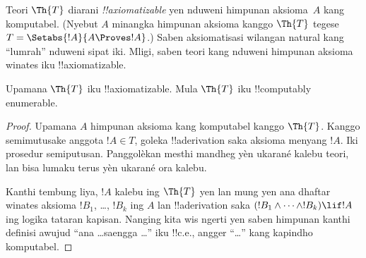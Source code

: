 \documentclass[../../../include/open-logic-section]{subfiles}
\begin{document}


Teori $\Th{T}$ diarani \emph{!!{axiomatizable}} yen nduweni
himpunan aksioma~$A$ kang komputabel. (Nyebut $A$ minangka himpunan
aksioma kanggo $\Th{T}$ tegese $T = \Setabs{!A}{A \Proves !A}$.)
Saben aksiomatisasi wilangan natural kang ``lumrah'' nduweni sipat iki.
Mligi, saben teori kang nduweni himpunan aksioma winates iku
!!{axiomatizable}.

\begin{lem}
Upamana $\Th{T}$ iku !!{axiomatizable}. Mula $\Th{T}$ iku !!{computably
enumerable}.
\end{lem}

\begin{proof}
Upamana $A$ himpunan aksioma kang komputabel kanggo $\Th{T}$. Kanggo
semimutusake anggota $!A \in T$, goleka !!a{derivation} saka aksioma
menyang $!A$. Iki prosedur semiputusan. Panggolèkan mesthi mandheg yèn ukarané kalebu teori, lan bisa lumaku terus yèn ukarané ora kalebu.

Kanthi tembung liya, $!A$ kalebu ing $\Th{T}$ yen lan mung yen ana
dhaftar winates aksioma $!B_1$, \dots, $!B_k$ ing $A$ lan !!a{derivation}
saka $(!B_1 \land \dots \land !B_k) \lif !A$ ing logika tataran kapisan.
Nanging kita wis ngerti yen saben himpunan kanthi definisi awujud
``ana \dots saengga \dots'' iku !!{c.e.}, angger ``\dots'' kang
kapindho komputabel.
\end{proof}
\end{document}
